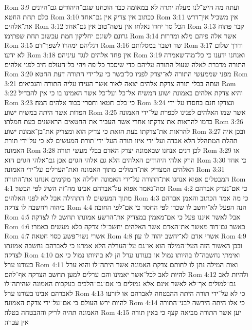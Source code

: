 Rom 3:9  ועתה מה היש־לנו מעלה יתרה לא במאומה כבר הוכחנו שגם־היהודים גם־היונים כלם תחת החטא׃
Rom 3:10  ככתוב אין צדיק אין גם־אחד׃
Rom 3:11  אין משכיל אין־דרש את־אלהים׃
Rom 3:12  הכל סר יחדו נאלחו אין עשה־טוב אין גם־אחד׃
Rom 3:13  קבר פתוח גרונם לשונם יחליקון חמת עכשוב תחת שפתימו׃
Rom 3:14  אשר אלה פיהם מלא ומררות׃
Rom 3:15  רגליהם ימהרו לשפך־דם׃
Rom 3:16  שד ושבר במסלותם׃
Rom 3:17  ודרך שלום לא ידעו׃
Rom 3:18  אין פחד אלהים לנגד עיניהם׃
Rom 3:19  ואנחנו ידענו כי כל־מה־שאמרה התורה מדברת לאלה שעול התורה עליהם כדי שיסכר כל־פה ויהי כל־העולם חיב לפני אלהים׃
Rom 3:20  מפני שממעשי התורה לא־יצדק לפניו כל־בשר כי על־ידי התורה דעת החטא׃
Rom 3:21  ועתה בבלי תורה צדקת אלהים יצאה לאור אשר העידו עליה התורה והנביאים׃
Rom 3:22  והיא צדקת אלהים באמונת ישוע המשיח אל־כל ועל־כל אשר האמינו בו כי אין להבדיל׃
Rom 3:23  כי־כלם חטאו וחסרי־כבוד אלהים המה׃
Rom 3:24  ונצדקו חנם בחסדו על־ידי הפדות אשר היתה במשיח ישוע׃
Rom 3:25  אשר שמו האלהים לפנינו לכפרת על־ידי האמונה בדמו להראות את־צדקתו אחרי אשר העביר את־החטאים הראשנים בעת חמלתו׃
Rom 3:26  להראות את־צדקתו בעת הזאת כי צדיק הוא ומצדיק את־בן־אמונת ישוע׃
Rom 3:27  ובכן איה תהלת המתהלל הלא אבדה ועל־ידי איזו תורה העל־ידי־תורת המעשים לא כי על־ידי תורת האמונה׃
Rom 3:28  לכן דנים אנחנו שבאמונה יצדק האדם בבלי מעשי תורה׃
Rom 3:29  או הרק אלהי היהודים האלהים הלא גם אלהי הגוים אכן גם־אלהי הגוים הוא׃
Rom 3:30  כי אחד האלהים המצדיק את־המולים מתוך האמונה ואת־הערלים על־ידי האמונה׃
Rom 3:31  המבטלים אפוא אנחנו את־התורה על־ידי האמונה חלילה אך מקימים אנחנו את־התורה׃
Rom 4:1  ומה־נאמר אפוא על־אברהם אבינו מה־זה השיג לפי הבשר׃
Rom 4:2  כי אם־נצדק אברהם מתוך המעשים לו התהילה אבל לא לפני האלהים׃
Rom 4:3  כי מה אמר הכתוב והאמן אברהם ביהוה ויחשבה לו צדקה׃
Rom 4:4  הנה הפעל לא־יחשב לו שכרו לפי החסד כי אם־לפי החובה׃
Rom 4:5  אבל לאשר איננו פעל כי אם־מאמין במצדיק את־הרשע אמונתו תחשב לו לצדקה׃
Rom 4:6  כאשר גם־דוד מאשר את־האדם אשר האלהים יחשב־לו צדקה בלא מעשים באמרו׃
Rom 4:7  אשרי נשוי־פשע כסוי חטאה׃
Rom 4:8  אשרי אדם לא־יחשב יהוה לו עון׃
Rom 4:9  ובכן האשור הזה העל־המילה הוא או־גם על־הערלה הלא אמרנו כי לאברהם נחשבה אמונתו לצדקה׃
Rom 4:10  ואימתי נחשבה־לו בהיותו נמול או בעודנו ערל הן לא בהיותו נמול כי אם בעודנו ערל׃
Rom 4:11  ואות המילה נתן לו לחותם צדקת האמונה אשר היתה־לו והוא ערל להיות לאב לכל־אשר יאמינו והם ערלים למען תחשב הצדקה אף־להם׃
Rom 4:12  ולהיות לאב גם־למולים אך־לא לאשר אינם אלא נמולים כי אם־גם־הלכים בעקבות האמונה שהיתה־לו לאברהם אבינו בעודנו ערל׃
Rom 4:13  כי לא על־ידי תורה היתה ההבטחה לאברהם או לזרעו להיות ירש העולם כי אם־על־ידי צדקת האמונה׃
Rom 4:14  כי אלו היתה הירשה לבני־התורה האמונה תהיה לריק וההבטחה בטלה׃
Rom 4:15  יען אשר התורה מביאה קצף כי באין תורה אין עברה׃
